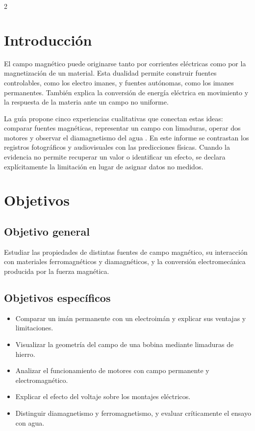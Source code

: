 \documentclass[10pt,letterpaper]{article}
\begin{document}
\begin{multicols}{2}
\raggedcolumns

\section{Introducción}

El campo magnético puede originarse tanto por corrientes eléctricas como por la magnetización de un material. Esta dualidad permite construir fuentes controlables, como los electro imanes, y fuentes autónomas, como los imanes permanentes. También explica la conversión de energía eléctrica en movimiento y la respuesta de la materia ante un campo no uniforme.

La guía propone cinco experiencias cualitativas que conectan estas ideas: comparar fuentes magnéticas, representar un campo con limaduras, operar dos motores y observar el diamagnetismo del agua \cite{guia2026}. En este informe se contrastan los registros fotográficos y audiovisuales con las predicciones físicas. Cuando la evidencia no permite recuperar un valor o identificar un efecto, se declara explícitamente la limitación en lugar de asignar datos no medidos.

\section{Objetivos}

\subsection{Objetivo general}

Estudiar las propiedades de distintas fuentes de campo magnético, su interacción con materiales ferromagnéticos y diamagnéticos, y la conversión electromecánica producida por la fuerza magnética.

\subsection{Objetivos específicos}

\begin{itemize}
  \item Comparar un imán permanente con un electroimán y explicar sus ventajas y limitaciones.
  \item Visualizar la geometría del campo de una bobina mediante limaduras de hierro.
  \item Analizar el funcionamiento de motores con campo permanente y electromagnético.
  \item Explicar el efecto del voltaje sobre los montajes eléctricos.
  \item Distinguir diamagnetismo y ferromagnetismo, y evaluar críticamente el ensayo con agua.
\end{itemize}


\end{multicols}
\end{document}
